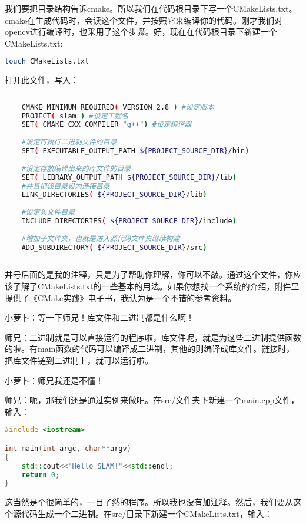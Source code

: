 \documentclass[9pt,a4paper]{article}
\begin{document}
我们要把目录结构告诉cmake。所以我们在代码根目录下写一个CMakeLists.txt。cmake在生成代码时，会读这个文件，并按照它来编译你的代码。刚才我们对opencv进行编译时，也采用了这个步骤。好，现在在代码根目录下新建一个CMakeLists.txt:

\begin{lstlisting}[language=sh]
touch CMakeLists.txt
\end{lstlisting}

打开此文件，写入：
\begin{lstlisting}[language=sh]
	
	CMAKE_MINIMUM_REQUIRED( VERSION 2.8 ) #设定版本
	PROJECT( slam ) #设定工程名
	SET( CMAKE_CXX_COMPILER "g++") #设定编译器
	
	#设定可执行二进制文件的目录
	SET( EXECUTABLE_OUTPUT_PATH ${PROJECT_SOURCE_DIR}/bin) 
	
	#设定存放编译出来的库文件的目录
	SET( LIBRARY_OUTPUT_PATH ${PROJECT_SOURCE_DIR}/lib) 
	#并且把该目录设为连接目录
	LINK_DIRECTORIES( ${PROJECT_SOURCE_DIR}/lib)
	
	#设定头文件目录
	INCLUDE_DIRECTORIES( ${PROJECT_SOURCE_DIR}/include)
	
	#增加子文件夹，也就是进入源代码文件夹继续构建
	ADD_SUBDIRECTORY( ${PROJECT_SOURCE_DIR}/src)
	
\end{lstlisting}

井号后面的是我的注释，只是为了帮助你理解，你可以不敲。通过这个文件，你应该了解了CMakeLists.txt的一些基本的用法。如果你想找一个系统的介绍，附件里提供了《CMake实践》电子书，我认为是一个不错的参考资料。

小萝卜：等一下师兄！库文件和二进制都是什么啊！

师兄：二进制就是可以直接运行的程序啦，库文件呢，就是为这些二进制提供函数的啦。有main函数的代码可以编译成二进制，其他的则编译成库文件。链接时，把库文件链到二进制上，就可以运行啦。

小萝卜：师兄我还是不懂！

师兄：呃，那我们还是通过实例来做吧。在src/文件夹下新建一个main.cpp文件，输入：

\begin{lstlisting}[language=C++]
#include <iostream>

int main(int argc, char**argv)
{
	std::cout<<"Hello SLAM!"<<std::endl;
	return 0;
}
\end{lstlisting}

这当然是个很简单的，一目了然的程序。所以我也没有加注释。然后，我们要从这个源代码生成一个二进制。在src/目录下新建一个CMakeLists.txt，输入：
\end{document}
